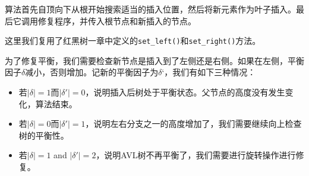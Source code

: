 \documentclass[UTF8]{article}
\begin{document}
算法首先自顶向下从根开始搜索适当的插入位置，然后将新元素作为叶子插入。最后它调用修复程序，并传入根节点和新插入的节点。

这里我们复用了红黑树一章中定义的\texttt{set\_left()}和\texttt{set\_right()}方法。

为了修复平衡，我们需要检查新节点是插入到了左侧还是右侧。如果在左侧，平衡因子$\delta$减小，否则增加。记新的平衡因子为$\delta‘$，我们有如下三种情况：

\begin{itemize}
\item 若$|\delta| = 1$而$|\delta'| = 0$，说明插入后树处于平衡状态。父节点的高度没有发生变化，算法结束。

\item 若$|\delta| = 0$而$|\delta'| = 1$，说明左右分支之一的高度增加了，我们需要继续向上检查树的平衡性。

\item 若$|\delta| = 1$ and $|\delta'| = 2$，说明AVL树不再平衡了，我们需要进行旋转操作进行修复。
\end{itemize}
\end{document}
